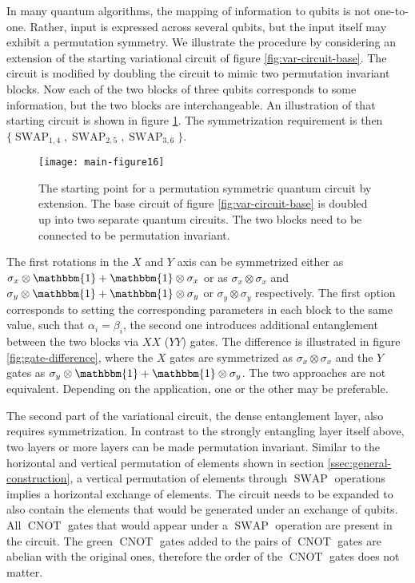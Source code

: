 \documentclass[%
 reprint,
 amsmath,amssymb,
 aps,
]{revtex4-2}
\newcommand{\SWAP}{\operatorname{SWAP}}
\newcommand{\CNOT}{\operatorname{CNOT}}
\theoremstyle{definition}%
\begin{document}
In many quantum algorithms, the mapping of information to qubits is not one-to-one. Rather, input is expressed across several qubits, but the input itself may exhibit a permutation symmetry.  We illustrate the procedure by considering an extension of the starting variational circuit of figure \ref{fig:var-circuit-base}. The circuit is modified by doubling the circuit to mimic two permutation invariant blocks. Now each of the two blocks of three qubits corresponds to some information, but the two blocks are interchangeable. An illustration of that starting circuit is shown in figure \ref{fig:variational-circuit}. The symmetrization requirement is then $\{\SWAP_{1,4}, \SWAP_{2,5}, \SWAP_{3, 6}\}$.

\begin{figure}[h]
    \centering
    \texttt{[image: main-figure16]}
    \caption{The starting point for a permutation symmetric quantum circuit by extension. The base circuit of figure \ref{fig:var-circuit-base} is doubled up into two separate quantum circuits. The two blocks need to be connected to be permutation invariant.}
    \label{fig:variational-circuit}
\end{figure}

The first rotations in the $X$ and $Y$ axis can be symmetrized either as $\sigma_x \otimes \mathbbm{1} + \mathbbm{1} \otimes \sigma_x$ or as $\sigma_x \otimes \sigma_x$ and $\sigma_y \otimes \mathbbm{1} + \mathbbm{1} \otimes \sigma_y$ or $\sigma_y \otimes \sigma_y$ respectively. The first option corresponds to setting the corresponding parameters in each block to the same value, such that $\alpha_i = \beta_i$, the second one introduces additional entanglement between the two blocks via $XX$ ($YY$) gates. The difference is illustrated in figure \ref{fig:gate-difference}, where the $X$ gates are symmetrized as $\sigma_x \otimes \sigma_x$ and the $Y$ gates as $\sigma_y \otimes \mathbbm{1} + \mathbbm{1} \otimes \sigma_y$. The two approaches are not equivalent. Depending on the application, one or the other may be preferable.

The second part of the variational circuit, the dense entanglement layer, also requires symmetrization. In contrast to the strongly entangling layer itself above, two layers or more layers can be made permutation invariant. Similar to the horizontal and vertical permutation of elements shown in section \ref{ssec:general-construction}, a vertical permutation of elements through $\SWAP$ operations implies a horizontal exchange of elements. The circuit needs to be expanded to also contain the elements that would be generated under an exchange of qubits. All $\CNOT$ gates that would appear under a $\SWAP$ operation are present in the circuit. The green $\CNOT$ gates added to the pairs of $\CNOT$ gates are abelian with the original ones, therefore the order of the $\CNOT$ gates does not matter. 
\end{document}
